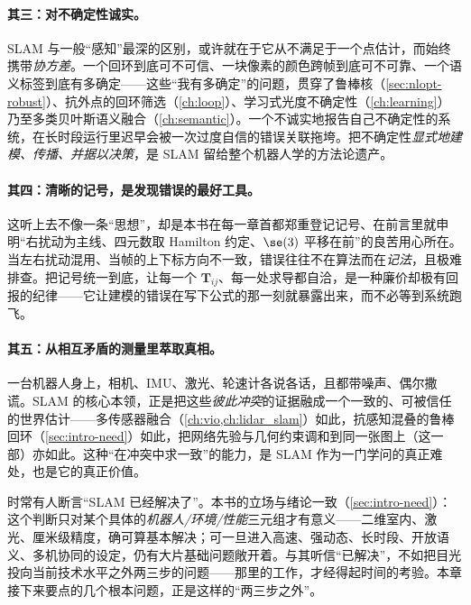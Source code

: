 \paragraph{其三：对不确定性诚实。}
SLAM 与一般“感知”最深的区别，或许就在于它从不满足于一个点估计，而始终携带\emph{协方差}。一个回环到底可不可信、一块像素的颜色跨帧到底可不可靠、一个语义标签到底有多确定——这些“我有多确定”的问题，贯穿了鲁棒核（\cref{sec:nlopt-robust}）、抗外点的回环筛选（\cref{ch:loop}）、学习式光度不确定性（\cref{ch:learning}）乃至多类贝叶斯语义融合（\cref{ch:semantic}）。一个不诚实地报告自己不确定性的系统，在长时段运行里迟早会被一次过度自信的错误关联拖垮。把不确定性\emph{显式地建模、传播、并据以决策}，是 SLAM 留给整个机器人学的方法论遗产。

\paragraph{其四：清晰的记号，是发现错误的最好工具。}
这听上去不像一条“思想”，却是本书在每一章首都郑重登记记号、在前言里就申明“右扰动为主线、四元数取 Hamilton 约定、$\se(3)$ 平移在前”的良苦用心所在。当左右扰动混用、当帧的上下标方向不一致，错误往往不在算法而在\emph{记法}，且极难排查。把记号统一到底，让每一个 $\mathbf{T}_{ij}$、每一处求导都自洽，是一种廉价却极有回报的纪律——它让建模的错误在写下公式的那一刻就暴露出来，而不必等到系统跑飞。

\paragraph{其五：从相互矛盾的测量里萃取真相。}
一台机器人身上，相机、IMU、激光、轮速计各说各话，且都带噪声、偶尔撒谎。SLAM 的核心本领，正是把这些\emph{彼此冲突}的证据融成一个一致的、可被信任的世界估计——多传感器融合（\cref{ch:vio,ch:lidar_slam}）如此，抗感知混叠的鲁棒回环（\cref{sec:intro-need}）如此，把网络先验与几何约束调和到同一张图上（这一部）亦如此。这种“在冲突中求一致”的能力，是 SLAM 作为一门学问的真正难处，也是它的真正价值。

\begin{insight}
时常有人断言“SLAM 已经解决了”。本书的立场与绪论一致（\cref{sec:intro-need}）：这个判断只对某个具体的\emph{机器人/环境/性能}三元组才有意义——二维室内、激光、厘米级精度，确可算基本解决；可一旦进入高速、强动态、长时段、开放语义、多机协同的设定，仍有大片基础问题敞开着。与其听信“已解决”，不如把目光投向当前技术水平之外两三步的问题——那里的工作，才经得起时间的考验。本章接下来要点的几个根本问题，正是这样的“两三步之外”。
\end{insight}

